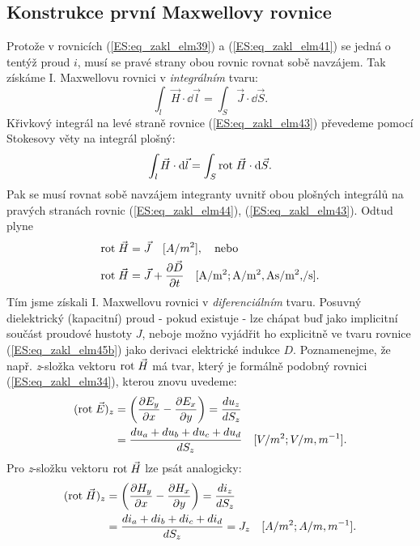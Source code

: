     \subsection{Konstrukce první Maxwellovy rovnice}
      Protože v rovnicích (\ref{ES:eq_zakl_elm39}) a (\ref{ES:eq_zakl_elm41}) se jedná o tentýž 
      proud \(i\), musí se pravé strany obou rovnic rovnat sobě navzájem. Tak získáme I. 
      Maxwellovu rovnici v \emph{integrálním} tvaru:
      \begin{equation}\label{ES:eq_zakl_elm43}
        \int_l \vec{H}\cdot \dd{\vec{l}} = \int_S \vec{J}\cdot \dd{\vec{S}}.
      \end{equation} 
      Křivkový integrál na levé straně rovnice (\ref{ES:eq_zakl_elm43}) převedeme pomocí Stokesovy 
      věty na integrál plošný:	
      \begin{equation}\label{ES:eq_zakl_elm44}
        \int_l \vec{H}\cdot \mathop{}\!\mathrm{d}\vec{l} = \int_S \mathrm{rot}\;\vec{H}\cdot \mathop{}\!\mathrm{d}\vec{S}.
      \end{equation} 
      Pak se musí rovnat sobě navzájem integranty uvnitř obou plošných integrálů na pravých 
      stranách rovnic (\ref{ES:eq_zakl_elm44}), (\ref{ES:eq_zakl_elm43}). Odtud plyne
      \begin{subequations}
        \begin{align}
          \rot{H} &= \vec{J} \quad [A/m^2], \quad\text{nebo}      \label{ES:eq_zakl_elm45a} \\
          \rot{H} &= \vec{J} + \pder{\vec{D}}{t} 
                     \quad %
                     [\si[per-mode = fraction]{\A\per\square\m; \A\per\square\m, \A\s\per\square\m, \per\s}].  \label{ES:eq_zakl_elm45b}
        \end{align}
      \end{subequations}
      Tím jsme získali I. Maxwellovu rovnici v \emph{diferenciálním} tvaru. Posuvný dielektrický 
      (kapacitní) proud - pokud existuje - lze chápat buď jako implicitní součást proudové hustoty 
      \(J\), neboje možno vyjádřit ho explicitně ve tvaru rovnice (\ref{ES:eq_zakl_elm45b}) 
      jako derivaci elektrické indukce \(D\). Poznamenejme, že např. \emph{z}-složka vektoru 
      \(\mathrm{rot}\;\vec{H}\) má tvar, který je formálně podobný rovnici (\ref{ES:eq_zakl_elm34}), kterou 
      znovu uvedeme:
      \begin{align*}
         (\mathrm{rot}\;\vec{E})_z &= \left(\dfrac{\partial E_y}{\partial x} - \dfrac{\partial E_x}{\partial y}\right)
                      = \frac{du_z}{dS_z}                                                  \\
                     &= \frac{du_a + du_b + du_c + du_d}{dS_z} \quad[V/m^2; V/m, m^{-1}].
      \end{align*}
      Pro \emph{z}-složku vektoru \(\mathrm{rot}\;\vec{H}\) lze psát analogicky:
      \begin{align*}
        (\mathrm{rot}\;\vec{H})_z &= \left(\dfrac{\partial H_y}{\partial x} - \dfrac{\partial H_x}{\partial y}\right)
                     = \frac{di_z}{dS_z}                                                   \\
                    &= \frac{di_a + di_b + di_c + di_d}{dS_z} = J_z \quad[A/m^2; A/m, m^{-1}].
      \end{align*}
      
